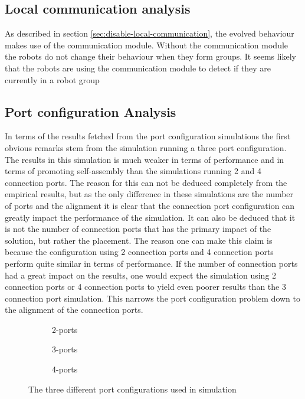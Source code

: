 \subsection{Local communication analysis}
As described in section \ref{sec:disable-local-communication}, the evolved behaviour makes use of the communication module.
Without the communication module the robots do not change their behaviour when they form groups.
It seems likely that the robots are using the communication module to detect if they are currently in a robot group


\subsection{Port configuration Analysis}
In terms of the results fetched from the port configuration simulations the first obvious remarks stem from the simulation running a three port configuration.
The results in this simulation is much weaker in terms of performance and in terms of promoting self-assembly than the simulations running 2 and 4 connection ports.
The reason for this can not be deduced completely from the empirical results, but as the only difference in these simulations are the number of ports and the alignment it is clear that the connection port configuration can greatly impact the performance of the simulation.
It can also be deduced that it is not the number of connection ports that has the primary impact of the solution, but rather the placement.
The reason one can make this claim is because the configuration using 2 connection ports and 4 connection ports perform quite similar in terms of performance.
If the number of connection ports had a great impact on the results, one would expect the simulation using 2 connection ports or 4 connection ports to yield even poorer results than the 3 connection port simulation.
This narrows the port configuration problem down to the alignment of the connection ports.

\begin{figure}[H]
	\centering
	\begin{subfigure}[b]{0.31\textwidth}
		\centering
		\caption{2-ports}
	\end{subfigure}
	\begin{subfigure}[b]{0.31\textwidth}
		\centering
		\caption{3-ports}
	\end{subfigure}
	\begin{subfigure}[b]{0.31\textwidth}
		\centering
		\caption{4-ports}
	\end{subfigure}
	\caption{The three different port configurations used in simulation}
	\label{fig:robot-port-configuration}
\end{figure}

